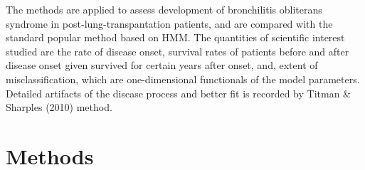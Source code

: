 \documentclass{uwstat572}
\begin{document}
The methods are applied to assess development of bronchilitis obliterans syndrome in post-lung-transpantation patients, and are compared with the standard popular method based on HMM. The quantities of scientific interest studied are the rate of disease onset, survival rates of patients before and after disease onset given survived for certain years after onset, and, extent of misclassification, which are one-dimensional functionals of the model parameters. Detailed artifacts of the disease process and better fit is recorded by Titman \& Sharples (2010) method.

%
%
%
\section{Methods}
\end{document}
